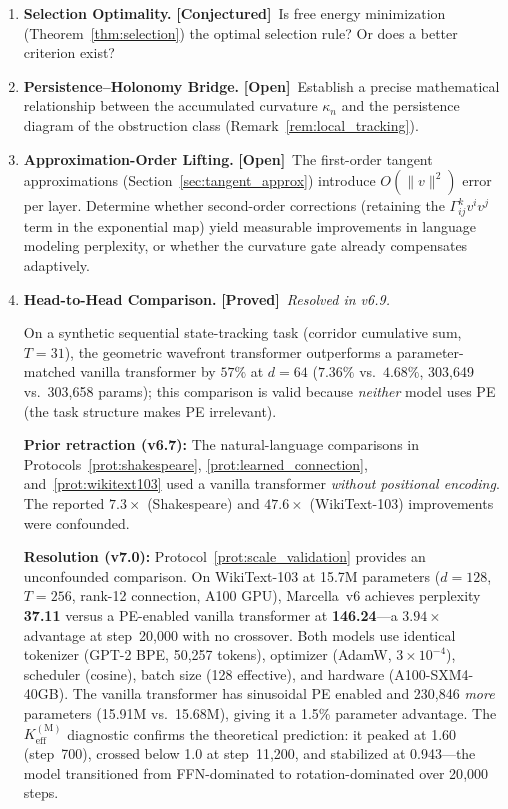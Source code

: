 \documentclass[11pt,a4paper]{article}
\theoremstyle{definition}
\theoremstyle{remark}
\newcommand{\statusproved}{\textcolor{green!50!black}{\textbf{[Proved]}}}
\newcommand{\statusconjecture}{\textcolor{orange!80!black}{\textbf{[Conjectured]}}}
\newcommand{\statusopen}{\textcolor{red!70!black}{\textbf{[Open]}}}
\begin{document}
\begin{enumerate}[label=\textbf{OP\arabic*.},leftmargin=2.5em]
    \item \textbf{Selection Optimality.} \statusconjecture\ Is 
    free energy minimization (Theorem~\ref{thm:selection}) the 
    optimal selection rule? Or does a better criterion exist?
    
    \item \textbf{Persistence--Holonomy Bridge.} \statusopen\ 
    Establish a precise mathematical relationship between the 
    accumulated curvature $\kappa_n$ and the persistence diagram 
    of the obstruction class 
    (Remark~\ref{rem:local_tracking}).
    
    \item \textbf{Approximation-Order Lifting.} \statusopen\ 
    The first-order tangent approximations 
    (Section~\ref{sec:tangent_approx}) introduce $O(\|v\|^2)$ 
    error per layer. Determine whether second-order corrections 
    (retaining the $\Gamma^k_{ij} v^i v^j$ term in the 
    exponential map) yield measurable improvements in language 
    modeling perplexity, or whether the curvature gate already 
    compensates adaptively.
    
    \item \textbf{Head-to-Head Comparison.} \statusproved\ 
    \emph{Resolved in v6.9.}
    
    On a synthetic sequential 
    state-tracking task (corridor cumulative sum, $T = 31$), the 
    geometric wavefront transformer outperforms a 
    parameter-matched vanilla transformer by $57\%$ at $d = 64$ 
    ($7.36\%$ vs.\ $4.68\%$, 303{,}649 vs.\ 303{,}658 params); 
    this comparison is valid because \emph{neither} model uses PE 
    (the task structure makes PE irrelevant). 
    
    \textbf{Prior retraction (v6.7):} The natural-language comparisons 
    in Protocols~\ref{prot:shakespeare}, 
    \ref{prot:learned_connection}, and~\ref{prot:wikitext103} 
    used a vanilla transformer \emph{without positional 
    encoding}. The reported $7.3\times$ (Shakespeare) and 
    $47.6\times$ (WikiText-103) improvements were confounded.
    
    \textbf{Resolution (v7.0):} Protocol~\ref{prot:scale_validation}
    provides an unconfounded comparison. On WikiText-103 at 15.7M 
    parameters ($d = 128$, $T = 256$, rank-12 connection, A100 GPU), 
    Marcella~v6 achieves perplexity \textbf{37.11} versus a 
    PE-enabled vanilla transformer at \textbf{146.24}---a 
    $\mathbf{3.94\times}$ advantage at step~20{,}000 with no crossover.
    Both models use identical tokenizer (GPT-2 BPE, 50{,}257 tokens),
    optimizer (AdamW, $3 \times 10^{-4}$), scheduler (cosine),
    batch size (128 effective), and hardware (A100-SXM4-40GB).
    The vanilla transformer has sinusoidal PE enabled and 230{,}846
    \emph{more} parameters (15.91M vs.\ 15.68M), giving it a 1.5\%
    parameter advantage. The $K_{\mathrm{eff}}^{(\mathrm{M})}$
    diagnostic confirms the theoretical prediction: it peaked at
    1.60 (step~700), crossed below 1.0 at step~11{,}200, and
    stabilized at 0.943---the model transitioned from FFN-dominated
    to rotation-dominated over 20{,}000 steps.
    

\end{enumerate}
\end{document}
